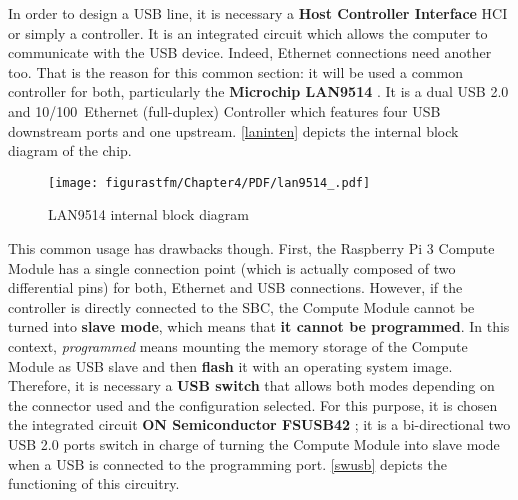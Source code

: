 In order to design a \acrshort{USB} line, it is necessary a \textbf{Host Controller Interface} \acrshort{HCI} or simply a controller. It is an integrated circuit which allows the computer to communicate with the \acrshort{USB} device. Indeed, Ethernet connections need another too. That is the reason for this common section: it will be used a common controller for both, particularly the \textbf{Microchip LAN9514} \cite{lan9514}. It is a dual \acrshort{USB} 2.0 and 10/100~Ethernet (full-duplex) Controller which features four \acrshort{USB} downstream ports and one upstream. \autoref{laninten} depicts the internal block diagram of the chip.


\begin{figure} [H]
			\centering
			\texttt{[image: figurastfm/Chapter4/PDF/lan9514\_.pdf]}
			\caption{LAN9514 internal block diagram \cite{lan9514}} \label{laninten}
\end{figure}

This common usage has drawbacks though. First, the Raspberry Pi 3 Compute Module has a single connection point (which is actually composed of two differential pins) for both, Ethernet and \acrshort{USB} connections. However, if the controller is directly connected to the \acrshort{SBC}, the Compute Module cannot be turned into \textbf{slave mode}, which means that \textbf{it cannot be programmed}. In this context, \textit{programmed} means mounting the memory storage of the Compute Module as \acrshort{USB} slave and then \textbf{flash} it with an operating system image. Therefore, it is necessary a \textbf{\acrshort{USB} switch} that allows both modes depending on the connector used and the configuration selected. For this purpose, it is chosen the integrated circuit \textbf{ON Semiconductor FSUSB42} \cite{onsemi}; it is a bi-directional two \acrshort{USB} 2.0 ports switch in charge of turning the Compute Module into slave mode when a \acrshort{USB} is connected to the programming port. \autoref{swusb} depicts the functioning of this circuitry. 

